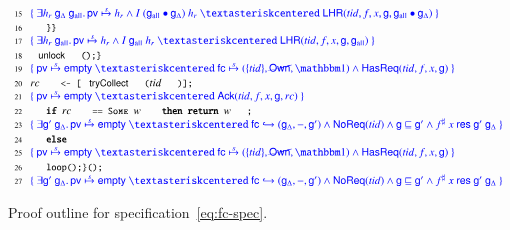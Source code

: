 \begin{figure}[t!]
\[{\begin{array}{r@{\ \ \ }l@{\ }l}
  \Num{15} & \sspec{~
     \exists h_r~\gd~\gall\ldot \hpriv \spts h_r  \aand
    I~(\gall \join \gd)~h_r ~\sep~
    \lhr{\tid, f, x, \g, \gall \join \gd}~} & 
  \\[1pt] 
  \Num{16} &  \eesc{\}\}}        & 
  \\
  \Num{17} &   \sspec{~\exists h_r~\gall\ldot \hpriv \spts h_r  \aand I~\gall~h_r 
    ~\sep~ \lhr{\tid, f, x, \g, \gall}~} & 
  \\[1.5pt]
  \Num{18} &  \aact{unlock}\eesc{();\}}        & 
  \\
  \Num{19} & \sspec{~\hpriv \spts \hempty ~\sep~
    \hfc \spts (\set{\tid}, \lockNown, \pcmU) \aand \requested{\tid, f, x, \g} ~} & 
  \\[1.5pt]
  \Num{20} &  rc\eesc{ <- [}\aact{tryCollect} \eesc{(}tid\eesc{)];}        & 
  \\
  \Num{21} & \sspec{~\hpriv \spts \hempty ~\sep~ 
    \ack{\tid, f, x, \g, {rc}} ~} & 
  \\[1.5pt]
  \Num{22} &  \eesc{\textbf{if} }rc\eesc{ == \textsc{Some} }w\eesc{
    \textbf{then} \textbf{return} } w\eesc{;}        & 
  \\
  \Num{23} & \sspec{~
     \exists \g'~\gd\ldot \hpriv \spts \hempty ~\sep~
     \histso{\hfc}{\gd, -, \g'} \aand \noreqs{\tid} \aand 
     \g \pre \g' \aand
     \fspec{f}~x~\res~\g'~\gd 
   ~} &
  \\[1.5pt]
  \Num{24} &  \eesc{\textbf{else}}        & 
  \\
  \Num{25} & \sspec{~\hpriv \spts \hempty ~\sep~
    \hfc \spts (\set{\tid}, \lockNown, \pcmU) \aand \requested{\tid, f, x, \g} ~} & 
  \\[1.5pt]
  \Num{26} &  \eesc{loop();\}();}        & 
  \\
  \Num{27} & \sspec{~
     \exists \g'~\gd\ldot \hpriv \spts \hempty ~\sep~
     \histso{\hfc}{\gd, -, \g'} \aand \noreqs{\tid} \aand 
     \g \pre \g' \aand
     \fspec{f}~x~\res~\g'~\gd 
   ~} & 
\end{array}
}
\]
%
\caption{Proof outline for  specification~\eqref{eq:fc-spec}.}
\label{fig:flatco-proof}
\end{figure}

